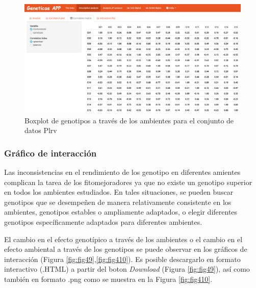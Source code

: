 \begin{figure}[H]
	\begin{center}
		\includegraphics[width=17cm]{./Graficos/corr_matrix.png}
	\end{center}
	\caption{Boxplot de genotipos a través de los ambientes para el conjunto de datos Plrv}
	\label{fig:fig47}
\end{figure}



\subsubsection{Gráfico de interacción}

Las inconsistencias en el rendimiento de los genotipo en diferentes amientes complican la tarea de los fitomejoradores ya que no existe un genotipo superior en todos los ambientes estudiados. En tales situaciones, se pueden buscar genotipos que se desempeñen de manera relativamente consistente en los ambientes, genotipos estables o ampliamente adaptados, o elegir diferentes genotipos específicamente adaptados para diferentes ambientes. 

El cambio en el efecto genotípico a través de los ambientes o el cambio en el efecto ambiental a través de los genotipos se puede observar en los gráficos de interacción (Figura \ref{fig:fig49},\ref{fig:fig410}). Es posible descargarlo en formato interactivo (.HTML) a partir del boton \emph{Download} (Figura \ref{fig:fig49}), así como también en formato .png como se muestra en la Figura \ref{fig:fig410}.


